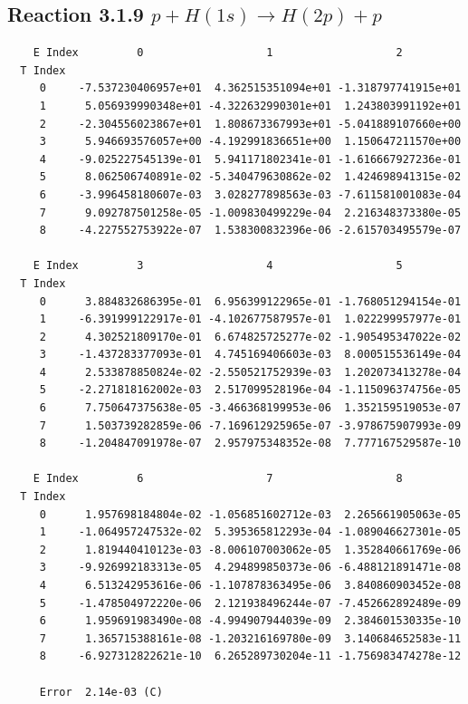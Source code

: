 \documentclass[12pt,dvipdfmx]{article}
\begin{document}
\newpage
\subsection{
Reaction 3.1.9 $   p + H(1s) \rightarrow H(2p) + p$}


\begin{small}\begin{verbatim}
    E Index         0                   1                   2
  T Index
     0     -7.537230406957e+01  4.362515351094e+01 -1.318797741915e+01
     1      5.056939990348e+01 -4.322632990301e+01  1.243803991192e+01
     2     -2.304556023867e+01  1.808673367993e+01 -5.041889107660e+00
     3      5.946693576057e+00 -4.192991836651e+00  1.150647211570e+00
     4     -9.025227545139e-01  5.941171802341e-01 -1.616667927236e-01
     5      8.062506740891e-02 -5.340479630862e-02  1.424698941315e-02
     6     -3.996458180607e-03  3.028277898563e-03 -7.611581001083e-04
     7      9.092787501258e-05 -1.009830499229e-04  2.216348373380e-05
     8     -4.227552753922e-07  1.538300832396e-06 -2.615703495579e-07

    E Index         3                   4                   5
  T Index
     0      3.884832686395e-01  6.956399122965e-01 -1.768051294154e-01
     1     -6.391999122917e-01 -4.102677587957e-01  1.022299957977e-01
     2      4.302521809170e-01  6.674825725277e-02 -1.905495347022e-02
     3     -1.437283377093e-01  4.745169406603e-03  8.000515536149e-04
     4      2.533878850824e-02 -2.550521752939e-03  1.202073413278e-04
     5     -2.271818162002e-03  2.517099528196e-04 -1.115096374756e-05
     6      7.750647375638e-05 -3.466368199953e-06  1.352159519053e-07
     7      1.503739282859e-06 -7.169612925965e-07 -3.978675907993e-09
     8     -1.204847091978e-07  2.957975348352e-08  7.777167529587e-10

    E Index         6                   7                   8
  T Index
     0      1.957698184804e-02 -1.056851602712e-03  2.265661905063e-05
     1     -1.064957247532e-02  5.395365812293e-04 -1.089046627301e-05
     2      1.819440410123e-03 -8.006107003062e-05  1.352840661769e-06
     3     -9.926992183313e-05  4.294899850373e-06 -6.488121891471e-08
     4      6.513242953616e-06 -1.107878363495e-06  3.840860903452e-08
     5     -1.478504972220e-06  2.121938496244e-07 -7.452662892489e-09
     6      1.959691983490e-08 -4.994907944039e-09  2.384601530335e-10
     7      1.365715388161e-08 -1.203216169780e-09  3.140684652583e-11
     8     -6.927312822621e-10  6.265289730204e-11 -1.756983474278e-12

     Error  2.14e-03 (C)
\end{verbatim}\end{small}
\end{document}

